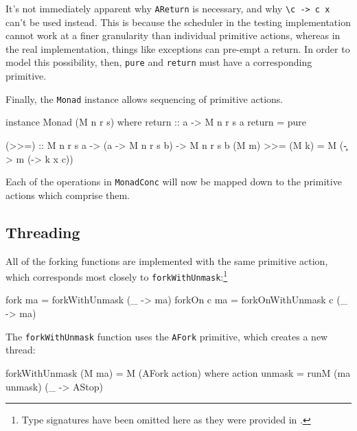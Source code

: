 
It's not immediately apparent why \verb|AReturn| is necessary, and why
\verb|\c -> c x| can't be used instead. This is because the scheduler
in the testing implementation cannot work at a finer granularity than
individual primitive actions, whereas in the real implementation,
things like exceptions can pre-empt a return. In order to model this
possibility, then, \verb|pure| and \verb|return| must have a
corresponding primitive.

Finally, the \verb|Monad| instance allows sequencing of primitive actions.

\begin{haskellcode}
instance Monad (M n r s) where
  return :: a -> M n r s a
  return = pure

  (>>=) :: M n r s a -> (a -> M n r s b) -> M n r s b
  (M m) >>= (M k) = M (\c -> m (\x -> k x c))
\end{haskellcode}

Each of the operations in \verb|MonadConc| will now be mapped down to
the primitive actions which comprise them.

\subsection{Threading}
\label{sec:execution-primops-threading}

All of the forking functions are implemented with the same primitive
action, which corresponds most closely to
\verb|forkWithUnmask|:\footnote{Type signatures have been omitted here
  as they were provided in .}

\begin{haskellcode}
fork     ma = forkWithUnmask     (\_ -> ma)
forkOn c ma = forkOnWithUnmask c (\_ -> ma)
\end{haskellcode}

The \verb|forkWithUnmask| function uses the \verb|AFork| primitive,
which creates a new thread:

\begin{haskellcode}
forkWithUnmask (M ma) = M (AFork action) where
  action unmask = runM (ma unmask) (\_ -> AStop)
\end{haskellcode}


